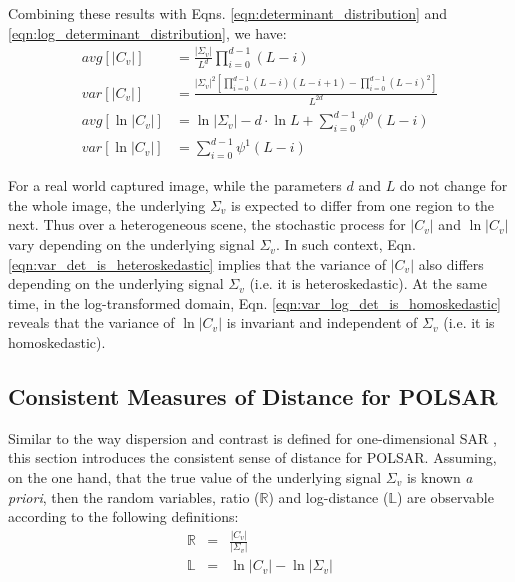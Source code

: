 \documentclass[journal]{IEEEtran}
\begin{document}
Combining these results with Eqns. \ref{eqn:determinant_distribution} and \ref{eqn:log_determinant_distribution}, we have:
\begin{align}
  avg \left[ |C_v| \right]  &= \frac{|\Sigma_v|}{L^d} \prod^{d-1}_{i=0} (L-i)\\
  var \left[ |C_v| \right]  &=   \frac{|\Sigma_v|^2 \left[ \prod^{d-1}_{i=0} (L-i)(L-i+1) - \prod^{d-1}_{i=0} (L-i)^2 \right] }{L^{2d}} \label{eqn:var_det_is_heteroskedastic}\\
  avg \left[ \ln |C_v| \right] &= \ln |\Sigma_v| - d \cdot \ln{L}  + \sum^{d-1}_{i=0} \psi^0(L-i) \label{eqn:avg_log_det} \\
  var \left[ \ln |C_v| \right] &=  \sum^{d-1}_{i=0} \psi^1(L-i) \label{eqn:var_log_det_is_homoskedastic}
\end{align}

For a real world captured image, while the parameters $d$ and $L$ do not change for the whole image,
  the underlying $\Sigma_v$ is expected to differ from one region to the next.
Thus over a heterogeneous scene, the stochastic process for $|C_v|$ and $\ln |C_v|$ vary depending on the underlying signal $\Sigma_v$. 
In such context, Eqn. \ref{eqn:var_det_is_heteroskedastic} implies that the variance of $|C_v|$ also differs depending on the underlying signal $\Sigma_v$ (i.e. it is   heteroskedastic).
At the same time, in the log-transformed domain, Eqn. \ref{eqn:var_log_det_is_homoskedastic} reveals that
  the variance of $\ln |C_v|$ is invariant and independent of $\Sigma_v$ (i.e. it is homoskedastic).

\subsection{Consistent Measures of Distance for POLSAR}
\label{sec:distance_measure}

Similar to the way dispersion and contrast is defined for one-dimensional SAR \cite{Le_2010_ACRS},
  this section introduces the consistent sense of distance for POLSAR.
Assuming, on the one hand, that the true value of the underlying signal $\Sigma_v$ is known \textit{a priori},
then the random variables,
  ratio ($\mathbb{R}$) and log-distance ($\mathbb{L}$)
  are observable according to the following definitions:
\begin{eqnarray}
  \mathbb{R} &=& \frac{|C_v|}{|\Sigma_v|} \label{eqn:determinant_ratio_observables}\\
  \mathbb{L} &=& \ln|C_v| - \ln|\Sigma_v| \label{eqn:log_distance_observables} 
\end{eqnarray}
\end{document}
